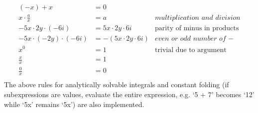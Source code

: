\documentclass[oneside, a4paper]{article}
\begin{document}
\begin{align*}
    (-x) + x                       & = 0                                  &                                      \\
    x \cdot \frac{a}{x}            & = a                                  & \textit{multiplication and division} \\
    -5x \cdot 2y \cdot (-6i)       & = 5x \cdot 2y \cdot 6i               & \text{parity of minus in products}   \\
    -5x \cdot (-2y) \cdot (-6i)    & = -\left(5x \cdot 2y \cdot 6i\right) & \textit{even or odd number of $-$}   \\
    x^0                            & = 1                                  & \text{trivial due to argument}       \\
    \frac{x}{x}                    & = 1                                  &                                      \\
    \frac{0}{x}                    & = 0                                  &                                      \\
\end{align*}
The above rules for analytically solvable integrals and constant folding (if subexpressions are values, evaluate the entire expression, e.g. `5 + 7' becomes `12' while `5x' remains `5x') are also implemented.


\end{document}
